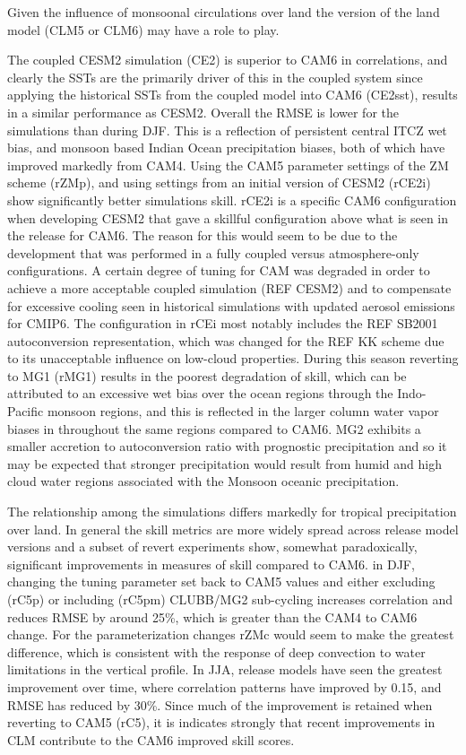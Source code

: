 Given the influence of monsoonal circulations over land the version of the land model (CLM5 or CLM6) may have a role to play. 

The coupled CESM2 simulation (CE2) is superior to CAM6 in correlations, and clearly the SSTs are the primarily driver of this in the coupled system since applying the historical SSTs from the coupled model into CAM6 (CE2sst), results in a similar performance as CESM2. Overall the RMSE is lower for the simulations than during DJF. This is a reflection of persistent central ITCZ wet bias, and monsoon based Indian Ocean precipitation biases, both of which have improved markedly from CAM4. Using the CAM5 parameter settings of the ZM scheme (rZMp), and using settings from an initial version of CESM2 (rCE2i) show significantly better simulations skill. rCE2i is a specific CAM6 configuration when developing CESM2 that gave a skillful configuration above what is seen in the release for CAM6. The reason for this would seem to be due to the development that was performed in a fully coupled versus atmosphere-only configurations. A certain degree of tuning for CAM was degraded in order to achieve a more acceptable coupled simulation (REF CESM2) and to compensate for excessive cooling seen in historical simulations with updated aerosol emissions for CMIP6. The configuration in rCEi most notably includes the REF SB2001 autoconversion representation, which was changed for the REF KK scheme due to its unacceptable influence on low-cloud properties. During this season reverting to MG1 (rMG1) results in the poorest degradation of skill, which can be attributed to an excessive wet bias over the ocean regions through the Indo-Pacific monsoon regions, and this is reflected in the larger column water vapor biases in throughout the same regions compared to CAM6. MG2 exhibits a smaller accretion to autoconversion ratio with prognostic precipitation \cite{gettelman2015} and so it may be expected that stronger precipitation would result from humid and high cloud water regions associated with the Monsoon oceanic precipitation.

The relationship among the simulations differs markedly for tropical precipitation over land. In general the skill metrics are more widely spread across release model versions and a subset of revert experiments show, somewhat paradoxically, significant improvements in measures of skill compared to CAM6. in DJF, changing the tuning parameter set back to CAM5 values and either excluding (rC5p) or including (rC5pm) CLUBB/MG2 sub-cycling increases correlation and reduces RMSE by around 25\%, which is greater than the CAM4 to CAM6 change. For the parameterization changes rZMc would seem to make the greatest difference, which is consistent with the response of deep convection to water limitations in the vertical profile. In JJA, release models have seen the greatest improvement over time, where correlation patterns have improved by 0.15, and RMSE has reduced by 30\%. Since much of the improvement is retained when reverting to CAM5 (rC5), it is indicates strongly that recent improvements in CLM contribute to the CAM6 improved skill scores.


